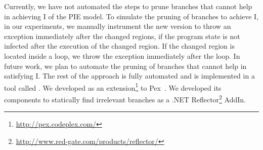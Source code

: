 
Currently, we have not automated the steps to prune branches that cannot help in achieving I of the PIE model. To simulate the pruning of branches to achieve I, in our experiments, we manually instrument the new version to throw an exception immediately  after the changed regions, if the program state is not infected after the execution of the changed region. If the changed region is located inside a loop, we throw the exception immediately after the loop.
In future work, we plan to automate the pruning of branches that cannot help in satisfying I. 
The rest of the approach is fully automated and is implemented in a tool called . We developed  as an extension\footnote{\url{http://pex.codeplex.com/}} to Pex~\cite{Pex}. We developed its components to statically find irrelevant branches as a .NET Reflector\footnote{\url{http://www.red-gate.com/products/reflector/}} AddIn.


